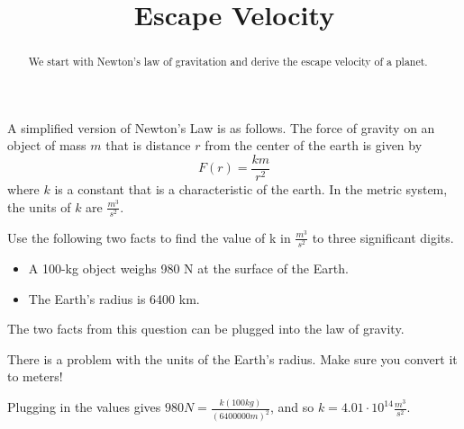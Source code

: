 \documentclass{ximera}
\title{Escape Velocity}
\begin{document}
\begin{abstract}
We start with Newton's law of gravitation and derive the escape velocity of a planet.
\end{abstract}
\maketitle

A simplified version of Newton's Law is as follows. The force of gravity on an object of mass $m$ that is distance $r$ from the center of the earth is given by
$$ F(r) = \frac{k m}{r^2}$$
where $k$ is a constant that is a characteristic of the earth. In the metric system, the units of $k$ are $\frac{m^3}{s^2}$.

\begin{question}
Use the following two facts to find the value of k in $\frac{m^3}{s^2}$ to three significant digits. 
\begin{itemize}
\item A 100-kg object weighs 980 N at the surface of the Earth.
\item The Earth's radius is 6400 km.
\end{itemize}
\begin{solution}
\begin{multiple-choice}
\end{multiple-choice}
\begin{hint}
The two facts from this question can be plugged into the law of gravity.
\end{hint}
\begin{hint}
There is a problem with the units of the Earth's radius. Make sure you convert it to meters!
\end{hint}
Plugging in the values gives $980 N = \frac{k (100 kg)}{(6400000 m)^2}$, and so $k = 4.01 \cdot 10^{14} \frac{m^3}{s^2}$.
\end{solution}
\end{question}
\end{document}
